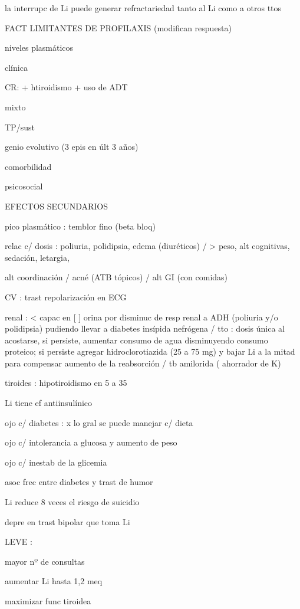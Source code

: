 la interrupc de Li puede generar refractariedad tanto al Li como a otros ttos

FACT LIMITANTES DE PROFILAXIS (modifican respuesta)

niveles plasmáticos

clínica

CR: + htiroidismo + uso de ADT

mixto

TP/sust

genio evolutivo (3 epis en últ 3 años)

comorbilidad

psicosocial

EFECTOS SECUNDARIOS

pico plasmático : temblor fino (beta bloq)

relac c/ dosis : poliuria, polidipsia, edema (diuréticos) / > peso, alt cognitivas, sedación, letargia,

alt coordinación / acné (ATB tópicos) / alt GI (con comidas)

CV : trast repolarización en ECG

renal : < capac en [ ] orina por disminuc de resp renal a ADH (poliuria y/o polidipsia) pudiendo llevar a diabetes insípida nefrógena / tto : dosis única al acostarse, si persiste, aumentar consumo de agua disminuyendo consumo proteico; si persiste agregar hidroclorotiazida (25 a 75 mg) y bajar Li a la mitad para compensar aumento de la reabsorción / tb amilorida ( ahorrador de K)

tiroides : hipotiroidismo en 5 a 35%

Li tiene ef antiinsulínico

ojo c/ diabetes : x lo gral se puede manejar c/ dieta

ojo c/ intolerancia a glucosa y aumento de peso

ojo c/ inestab de la glicemia

asoc frec entre diabetes y trast de humor

Li reduce 8 veces el riesgo de suicidio

depre en trast bipolar que toma Li

LEVE :

mayor nº de consultas

aumentar Li hasta 1,2 meq

maximizar func tiroidea

